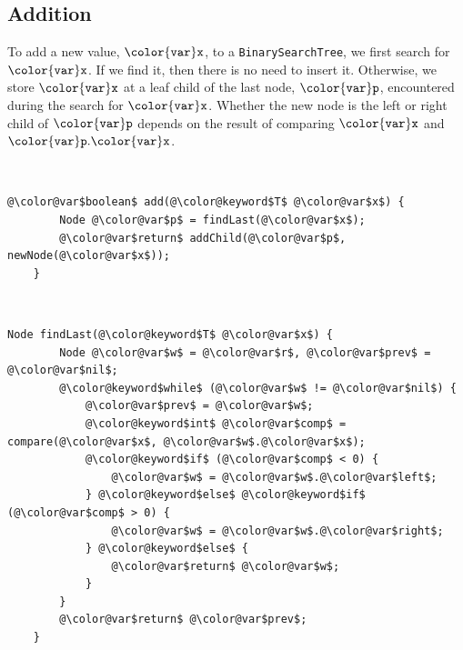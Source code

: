 \documentclass[10pt]{book}
\theoremstyle{plain}
\theoremstyle{definition}
\begin{document}
\subsection{Addition}

To add a new value, \ensuremath{\mathtt{{\color{var}x}}}, to a \texttt{BinarySearchTree}, we first search for
\ensuremath{\mathtt{{\color{var}x}}}. If we find it, then there is no need to insert it.  Otherwise,
we store \ensuremath{\mathtt{{\color{var}x}}} at a leaf child of the last node, \ensuremath{\mathtt{{\color{var}p}}}, encountered during the
search for \ensuremath{\mathtt{{\color{var}x}}}. Whether the new node is the left or right child of \ensuremath{\mathtt{{\color{var}p}}} depends on the result of comparing \ensuremath{\mathtt{{\color{var}x}}} and \ensuremath{\mathtt{{\color{var}p}.{\color{var}x}}}.


 \ \vspace{.5ex}\begin{Verbatim}[gobble=1,tabsize=2,frame=single,framerule=1.2pt,commandchars=\\@\$,label=\texttt{BinarySearchTree},labelposition=topline]
	@\color@var$boolean$ add(@\color@keyword$T$ @\color@var$x$) {
		Node @\color@var$p$ = findLast(@\color@var$x$);
		@\color@var$return$ addChild(@\color@var$p$, newNode(@\color@var$x$));		
	}
\end{Verbatim}



 \ \vspace{.5ex}\begin{Verbatim}[gobble=1,tabsize=2,frame=single,framerule=1.2pt,commandchars=\\@\$,label=\texttt{BinarySearchTree},labelposition=topline]
	Node findLast(@\color@keyword$T$ @\color@var$x$) {
		Node @\color@var$w$ = @\color@var$r$, @\color@var$prev$ = @\color@var$nil$;
		@\color@keyword$while$ (@\color@var$w$ != @\color@var$nil$) {
			@\color@var$prev$ = @\color@var$w$;
			@\color@keyword$int$ @\color@var$comp$ = compare(@\color@var$x$, @\color@var$w$.@\color@var$x$);
			@\color@keyword$if$ (@\color@var$comp$ < 0) {
				@\color@var$w$ = @\color@var$w$.@\color@var$left$;
			} @\color@keyword$else$ @\color@keyword$if$ (@\color@var$comp$ > 0) {
				@\color@var$w$ = @\color@var$w$.@\color@var$right$;
			} @\color@keyword$else$ {
				@\color@var$return$ @\color@var$w$;
			}
		}
		@\color@var$return$ @\color@var$prev$;
	}
\end{Verbatim}
\end{document}
